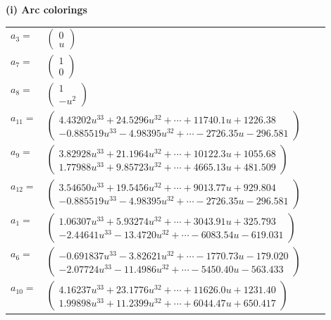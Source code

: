 \documentclass[1p]{elsarticle_modified}
\theoremstyle{definition}
\begin{document}
\flushleft \textbf{(i) Arc colorings}\\
\begin{tabular}{m{7pt} m{180pt} m{7pt} m{180pt} }
\flushright $a_{3}=$&$\begin{pmatrix}0\\u\end{pmatrix}$ \\
\flushright $a_{7}=$&$\begin{pmatrix}1\\0\end{pmatrix}$ \\
\flushright $a_{8}=$&$\begin{pmatrix}1\\- u^2\end{pmatrix}$ \\
\flushright $a_{11}=$&$\begin{pmatrix}4.43202 u^{33}+24.5296 u^{32}+\cdots+11740.1 u+1226.38\\-0.885519 u^{33}-4.98395 u^{32}+\cdots-2726.35 u-296.581\end{pmatrix}$ \\
\flushright $a_{9}=$&$\begin{pmatrix}3.82928 u^{33}+21.1964 u^{32}+\cdots+10122.3 u+1055.68\\1.77988 u^{33}+9.85723 u^{32}+\cdots+4665.13 u+481.509\end{pmatrix}$ \\
\flushright $a_{12}=$&$\begin{pmatrix}3.54650 u^{33}+19.5456 u^{32}+\cdots+9013.77 u+929.804\\-0.885519 u^{33}-4.98395 u^{32}+\cdots-2726.35 u-296.581\end{pmatrix}$ \\
\flushright $a_{1}=$&$\begin{pmatrix}1.06307 u^{33}+5.93274 u^{32}+\cdots+3043.91 u+325.793\\-2.44641 u^{33}-13.4720 u^{32}+\cdots-6083.54 u-619.031\end{pmatrix}$ \\
\flushright $a_{6}=$&$\begin{pmatrix}-0.691837 u^{33}-3.82621 u^{32}+\cdots-1770.73 u-179.020\\-2.07724 u^{33}-11.4986 u^{32}+\cdots-5450.40 u-563.433\end{pmatrix}$ \\
\flushright $a_{10}=$&$\begin{pmatrix}4.16237 u^{33}+23.1776 u^{32}+\cdots+11626.0 u+1231.40\\1.99898 u^{33}+11.2399 u^{32}+\cdots+6044.47 u+650.417\end{pmatrix}$ \\

\end{tabular}
\end{document}
